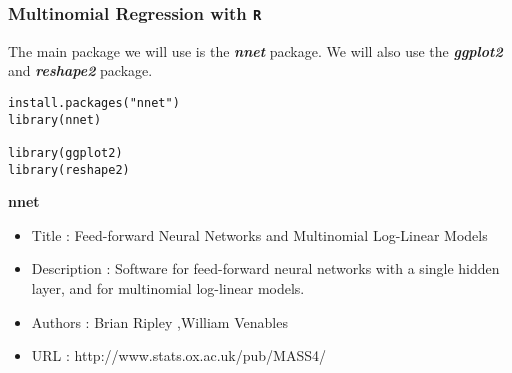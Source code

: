 \documentclass[00-GLMregslides.tex]{subfiles}
\begin{document}
\begin{frame}[fragile]

\frametitle{Multinomial Regression with \texttt{R}}
\Large
The main package we will use is the \textbf{\textit{nnet}} package. We will also use the \textbf{\textit{ggplot2}} and \textbf{\textit{reshape2}} package. 

\begin{framed}
\begin{verbatim}
install.packages("nnet")
library(nnet)

library(ggplot2)
library(reshape2)
\end{verbatim}
\end{framed}



\end{frame}
\begin{frame}
\textbf{nnet}

\begin{itemize}
\item Title : Feed-forward Neural Networks and Multinomial Log-Linear Models
\item Description : Software for feed-forward neural networks with a single
hidden layer, and for multinomial log-linear models.
\item Authors : Brian Ripley ,William Venables 
\item URL : http://www.stats.ox.ac.uk/pub/MASS4/
\end{itemize}

\end{frame}
\end{document}
